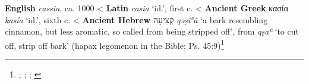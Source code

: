 \begin{etymology}\label{ety:cassia}
\textbf{English} \textit{cassia}, ca. 1000
< \textbf{Latin} \textit{casia} `id.', first c. \AD{}
< \textbf{Ancient Greek} {κασία} \textit{kasía} `id.', sixth c. \BC{}
< \textbf{Ancient Hebrew} {קְצִיעָה} \textit{qəṣîʿâ} `a bark resembling cinnamon, but less aromatic, so called from being stripped off', from \textit{qṣaʿ} `to cut off, strip off bark' (hapax legomenon in the Bible; Ps. 45:9)\footnote{\textcite[s.v. cassia]{oed}; \textcite{rosol_early_2018}; \textcite[653]{beekes_etymological_2010}; \textcite[589]{klein_comprehensive_1987}}
\end{etymology}